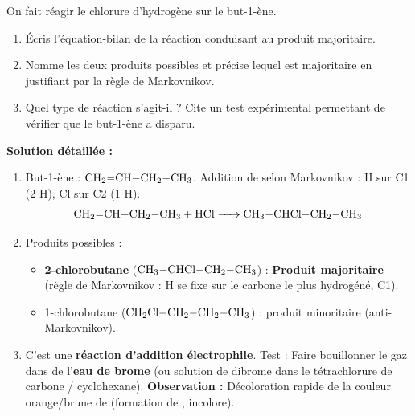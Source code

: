 \documentclass[11pt]{article}
\begin{document}
\begin{exoresolu}
On fait réagir le chlorure d'hydrogène  sur le but-1-ène.
\begin{enumerate}
\item Écris l'équation-bilan de la réaction conduisant au produit majoritaire.
\item Nomme les deux produits possibles et précise lequel est majoritaire en justifiant par la règle de Markovnikov.
\item Quel type de réaction s'agit-il ? Cite un test expérimental permettant de vérifier que le but-1-ène a disparu.
\end{enumerate}
\tcblower
\textbf{Solution détaillée :}
\begin{enumerate}
\item But-1-ène : $\ce{CH2=CH-CH2-CH3}$. Addition de  selon Markovnikov : H sur C1 (2 H), Cl sur C2 (1 H).
  \[ \ce{CH2=CH-CH2-CH3 + HCl -> CH3-CHCl-CH2-CH3} \]
\item Produits possibles :
  \begin{itemize}
  \item \textbf{2-chlorobutane} ($\ce{CH3-CHCl-CH2-CH3}$) : \textbf{Produit majoritaire} (règle de Markovnikov : H se fixe sur le carbone le plus hydrogéné, C1).
  \item 1-chlorobutane ($\ce{CH2Cl-CH2-CH2-CH3}$) : produit minoritaire (anti-Markovnikov).
  \end{itemize}
\item C'est une \textbf{réaction d'addition électrophile}.
  Test : Faire bouillonner le gaz dans de l'\textbf{eau de brome} (ou solution de dibrome dans le tétrachlorure de carbone / cyclohexane). \textbf{Observation :} Décoloration rapide de la couleur orange/brune de  (formation de , incolore).
\end{enumerate}
\end{exoresolu}
\end{document}
